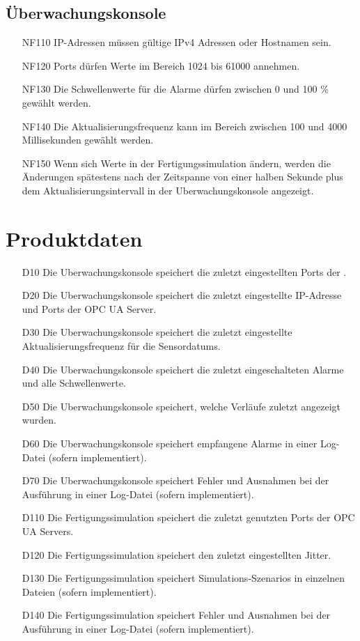 \documentclass[parskip=full]{scrartcl}
\begin{document}
\subsection{Überwachungskonsole}
\begin{enumerate}
  \item[NF110] IP-Adressen müssen gültige IPv4 Adressen oder Hostnamen sein. %
  \item[NF120] Ports dürfen Werte im Bereich 1024 bis 61000 annehmen.
  \item[NF130] Die Schwellenwerte für die Alarme dürfen zwischen 0 und 100 \% gewählt werden.
  \item[NF140] Die Aktualisierungsfrequenz kann im Bereich zwischen 100 und 4000 Millisekunden gewählt werden.
  \item[NF150] Wenn sich Werte in der \gls{Fertigungssimulation} ändern, werden die Änderungen spätestens nach der Zeitspanne von
    einer halben Sekunde plus dem Aktualisierungsintervall in der \gls{Uberwachungskonsole} angezeigt.
\end{enumerate}

\pagebreak
\section{Produktdaten}
\begin{enumerate}
  \item[D10] Die \gls{Uberwachungskonsole} speichert die zuletzt eingestellten Ports der .
  \item[D20] Die \gls{Uberwachungskonsole} speichert die zuletzt eingestellte IP-Adresse und Ports der \gls{OPC UA Server}.
  \item[D30] Die \gls{Uberwachungskonsole} speichert die zuletzt eingestellte Aktualisierungsfrequenz für die \glspl{Sensordatum}.
  \item[D40] Die \gls{Uberwachungskonsole} speichert die zuletzt eingeschalteten Alarme und alle Schwellenwerte.
  \item[D50] Die \gls{Uberwachungskonsole} speichert, welche Verläufe zuletzt angezeigt wurden.
  \item[D60] Die \gls{Uberwachungskonsole} speichert empfangene Alarme in einer Log-Datei (sofern implementiert).
  \item[D70] Die \gls{Uberwachungskonsole} speichert Fehler und Ausnahmen bei der Ausführung in einer Log-Datei (sofern implementiert).
  \item[D110] Die \gls{Fertigungssimulation} speichert die zuletzt genutzten Ports der \glspl{OPC UA Server}.
  \item[D120] Die \gls{Fertigungssimulation} speichert den zuletzt eingestellten \gls{Jitter}.
  \item[D130] Die \gls{Fertigungssimulation} speichert \glspl{Simulations-Szenario} in einzelnen Dateien (sofern implementiert).
  \item[D140] Die \gls{Fertigungssimulation} speichert Fehler und Ausnahmen bei der Ausführung in einer Log-Datei (sofern implementiert).
\end{enumerate}
\end{document}
